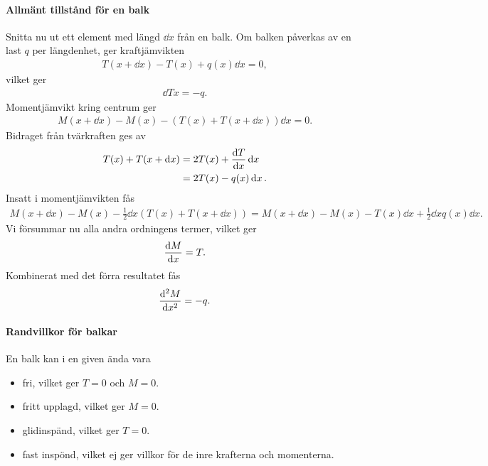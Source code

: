 \paragraph{Allmänt tillstånd för en balk}
Snitta nu ut ett element med längd $\dd{x}$ från en balk. Om balken påverkas av en last $q$ per längdenhet, ger kraftjämvikten
\begin{align*}
	T(x + \dd{x}) - T(x) + q(x)\dd{x} = 0,
\end{align*}
vilket ger
\begin{align*}
	\dd{T}{x} = -q.
\end{align*}
Momentjämvikt kring centrum ger
\begin{align*}
	M(x + \dd{x}) - M(x) - (T(x) + T(x + \dd{x}))\dd{x} = 0.
\end{align*}
Bidraget från tvärkraften ges av
\begin{align*}
	T(x) + T(x + \dd{x}) &= 2T(x) + \dv{T}{x}\dd{x} \\
	                     &= 2T(x) - q(x)\dd{x}.
\end{align*}
Insatt i momentjämvikten fås
\begin{align*}
	M(x + \dd{x}) - M(x) - \frac{1}{2}\dd{x}(T(x) + T(x + \dd{x})) = M(x + \dd{x}) - M(x) - T(x)\dd{x} + \frac{1}{2}\dd{x}q(x)\dd{x}.
\end{align*}
Vi försummar nu alla andra ordningens termer, vilket ger
\begin{align*}
	\dv{M}{x} = T.
\end{align*}
Kombinerat med det förra resultatet fås
\begin{align*}
	\dv[2]{M}{x} = -q.
\end{align*}

\paragraph{Randvillkor för balkar}
En balk kan i en given ända vara
\begin{itemize}
	\item fri, vilket ger $T = 0$ och $M = 0$.
	\item fritt upplagd, vilket ger $M = 0$.
	\item glidinspänd, vilket ger $T = 0$.
	\item fast inspönd, vilket ej ger villkor för de inre krafterna och momenterna.
\end{itemize}